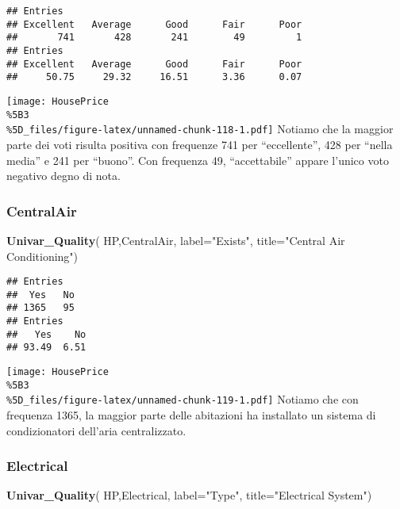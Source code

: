 \documentclass[
]{article}
\newenvironment{Shaded}{\begin{snugshade}}{\end{snugshade}}
\newcommand{\AttributeTok}[1]{\textcolor[rgb]{0.13,0.29,0.53}{#1}}
\newcommand{\FunctionTok}[1]{\textcolor[rgb]{0.13,0.29,0.53}{\textbf{#1}}}
\newcommand{\NormalTok}[1]{#1}
\newcommand{\StringTok}[1]{\textcolor[rgb]{0.31,0.60,0.02}{#1}}
\begin{document}
\begin{verbatim}
## Entries
## Excellent   Average      Good      Fair      Poor 
##       741       428       241        49         1 
## Entries
## Excellent   Average      Good      Fair      Poor 
##     50.75     29.32     16.51      3.36      0.07
\end{verbatim}

\texttt{[image: HousePrice\\\%5B3\\\%5D\_files/figure-latex/unnamed-chunk-118-1.pdf]}
Notiamo che la maggior parte dei voti risulta positiva con frequenze 741
per ``eccellente'', 428 per ``nella media'' e 241 per ``buono''. Con
frequenza 49, ``accettabile'' appare l'unico voto negativo degno di
nota.

\subsubsection{CentralAir}\label{centralair}

\begin{Shaded}
\begin{Highlighting}[]
\FunctionTok{Univar\_Quality}\NormalTok{(}
\NormalTok{  HP,CentralAir,}
  \AttributeTok{label=}\StringTok{"Exists"}\NormalTok{,}
  \AttributeTok{title=}\StringTok{"Central Air Conditioning"}\NormalTok{)}
\end{Highlighting}
\end{Shaded}

\begin{verbatim}
## Entries
##  Yes   No 
## 1365   95 
## Entries
##   Yes    No 
## 93.49  6.51
\end{verbatim}

\texttt{[image: HousePrice\\\%5B3\\\%5D\_files/figure-latex/unnamed-chunk-119-1.pdf]}
Notiamo che con frequenza 1365, la maggior parte delle abitazioni ha
installato un sistema di condizionatori dell'aria centralizzato.

\subsubsection{Electrical}\label{electrical}

\begin{Shaded}
\begin{Highlighting}[]
\FunctionTok{Univar\_Quality}\NormalTok{(}
\NormalTok{  HP,Electrical,}
  \AttributeTok{label=}\StringTok{"Type"}\NormalTok{,}
  \AttributeTok{title=}\StringTok{"Electrical System"}\NormalTok{)}
\end{Highlighting}
\end{Shaded}
\end{document}
